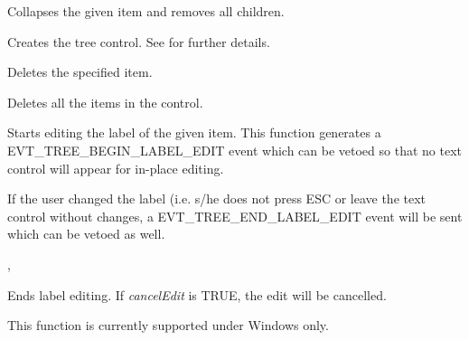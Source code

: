 
Collapses the given item and removes all children.

\label{wxtreectrlcreate}


Creates the tree control. See  for further details.

\label{wxtreectrldelete}


Deletes the specified item.

\label{wxtreectrldeleteallitems}


Deletes all the items in the control.

\label{wxtreectrleditlabel}


Starts editing the label of the given item. This function generates a
EVT\_TREE\_BEGIN\_LABEL\_EDIT event which can be vetoed so that no
text control will appear for in-place editing.

If the user changed the label (i.e. s/he does not press ESC or leave
the text control without changes, a EVT\_TREE\_END\_LABEL\_EDIT event
will be sent which can be vetoed as well.


,

\label{wxtreectrlendeditlabel}


Ends label editing. If {\it cancelEdit} is TRUE, the edit will be cancelled.

This function is currently supported under Windows only.

